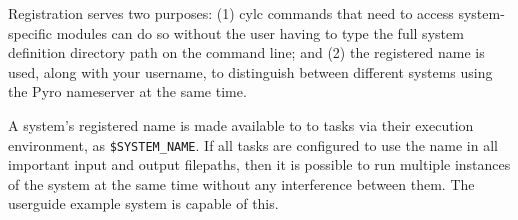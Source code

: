 Registration serves two purposes: (1) cylc commands that need to access
system-specific modules can do so without the user having to type the
full system definition directory path on the command line; and (2) the
registered name is used, along with your username, to distinguish
between different systems using the Pyro nameserver at the same time. 

A system's registered name is made available to to tasks via their
execution environment, as \lstinline=$SYSTEM_NAME=. If all tasks are
configured to use the name in all important input and output filepaths,
then it is possible to run multiple instances of the system at the same
time without any interference between them. The userguide example system
is capable of this.
